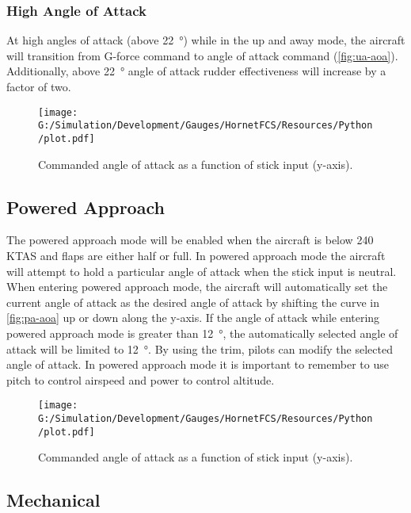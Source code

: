 \documentclass[11pt]{report}
\begin{document}
\subsubsection{High Angle of Attack}

At high angles of attack (above \SI{22}{\degree}) while in the up and away mode, the aircraft will transition from G-force command to angle of attack command (\autoref{fig:ua-aoa}).  Additionally, above \SI{22}{\degree} angle of attack rudder effectiveness will increase by a factor of two.

\begin{figure}[H]
    \centering
    \texttt{[image: G:/Simulation/Development/Gauges/HornetFCS/Resources/Python/plot.pdf]}
    \caption{Commanded angle of attack as a function of stick input (y-axis).}
    \label{fig:ua-aoa}
\end{figure}

\subsection{Powered Approach}

The powered approach mode will be enabled when the aircraft is below 240 KTAS and flaps are either half or full.  In powered approach mode the aircraft will attempt to hold a particular angle of attack when the stick input is neutral.  When entering powered approach mode, the aircraft will automatically set the current angle of attack as the desired angle of attack by shifting the curve in \autoref{fig:pa-aoa} up or down along the y-axis.  If the angle of attack while entering powered approach mode is greater than \SI{12}{\degree}, the automatically selected angle of attack will be limited to \SI{12}{\degree}.  By using the trim, pilots can modify the selected angle of attack.  In powered approach mode it is important to remember to use pitch to control airspeed and power to control altitude.

\begin{figure}[H]
    \centering
    \texttt{[image: G:/Simulation/Development/Gauges/HornetFCS/Resources/Python/plot.pdf]}
    \caption{Commanded angle of attack as a function of stick input (y-axis).}
    \label{fig:pa-aoa}
\end{figure}

\subsection{Mechanical}
\end{document}
